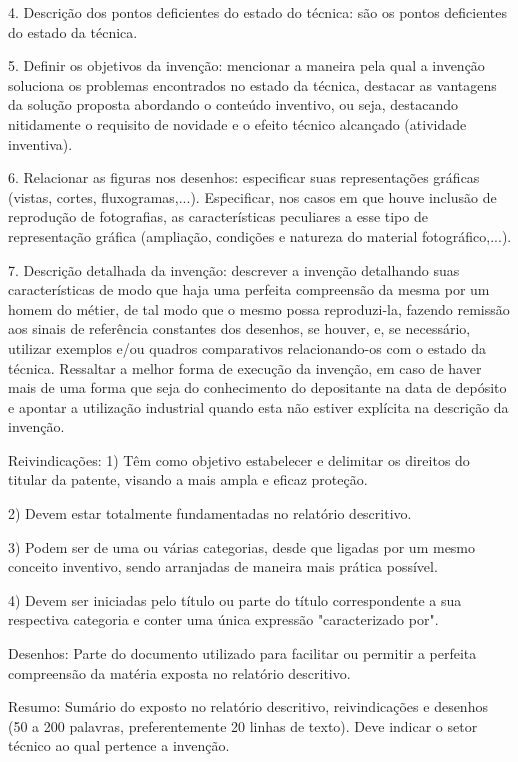 \documentclass[12pt]{article}
\begin{document}
 4. Descrição dos pontos deficientes do estado do técnica: são os
 pontos deficientes do estado da técnica.
 
 5. Definir os objetivos da invenção: mencionar a maneira pela qual a
 invenção soluciona os problemas encontrados no estado da técnica,
 destacar as vantagens da solução proposta abordando o conteúdo
 inventivo, ou seja, destacando nitidamente o requisito de novidade e
 o efeito técnico alcançado (atividade inventiva).
 
 6. Relacionar as figuras nos desenhos: especificar suas
 representações gráficas (vistas, cortes, fluxogramas,...).
 Especificar, nos casos em que houve inclusão de reprodução de
 fotografias, as características peculiares a esse tipo de
 representação gráfica (ampliação, condições e natureza do material
 fotográfico,...).
 
 7. Descrição detalhada da invenção: descrever a invenção detalhando
 suas características de modo que haja uma perfeita compreensão da
 mesma por um homem do métier, de tal modo que o mesmo possa
 reproduzi-la, fazendo remissão aos sinais de referência constantes
 dos desenhos, se houver, e, se necessário, utilizar exemplos e/ou
 quadros comparativos relacionando-os com o estado da técnica.
 Ressaltar a melhor forma de execução da invenção, em caso de haver
 mais de uma forma que seja do conhecimento do depositante na data de
 depósito e apontar a utilização industrial quando esta não estiver
 explícita na descrição da invenção.
 
 Reivindicações: 1) Têm como objetivo estabelecer e delimitar os
 direitos do titular da patente, visando a mais ampla e eficaz
 proteção.
 
 2) Devem estar totalmente fundamentadas no relatório descritivo.
 
 3) Podem ser de uma ou várias categorias, desde que ligadas por um
 mesmo conceito inventivo, sendo arranjadas de maneira mais prática
 possível.
 
 4) Devem ser iniciadas pelo título ou parte do título correspondente
 a sua respectiva categoria e conter uma única expressão
 "caracterizado por".
 
 Desenhos: Parte do documento utilizado para facilitar ou permitir a
 perfeita compreensão da matéria exposta no relatório descritivo.
 
 Resumo: Sumário do exposto no relatório descritivo, reivindicações e
 desenhos (50 a 200 palavras, preferentemente 20 linhas de texto).
 Deve indicar o setor técnico ao qual pertence a invenção.
\end{document}
